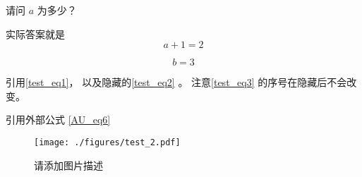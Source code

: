 \begin{example}{}
请问 $a$ 为多少？
\pay

实际答案就是
\begin{equation}\label{test_eq2}
a + 1 = 2
\end{equation}
\paid
\end{example}

\begin{equation}\label{test_eq3}
b = 3
\end{equation}

引用\autoref{test_eq1}， 以及隐藏的\autoref{test_eq2} 。 注意\autoref{test_eq3} 的序号在隐藏后不会改变。

引用外部公式 \autoref{AU_eq6}~
\begin{figure}[ht]
\centering
\texttt{[image: ./figures/test\_2.pdf]}
\caption{请添加图片描述} \label{test_fig2}
\end{figure}